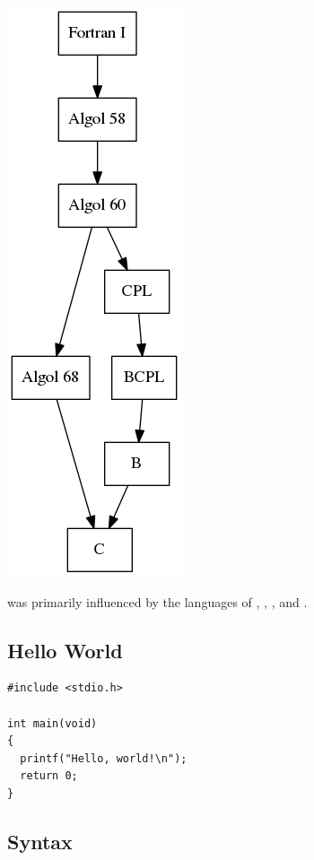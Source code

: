 \documentclass[../languages.tex]{subfiles}
\begin{document}
\begin{Figure}
  \centering
  \includegraphics[height=0.5\textheight]{c}
\end{Figure}

 was primarily influenced by the languages of ,
, , and .

\subsection{Hello World}
\label{sub:hello_world}

\begin{verbatim}
#include <stdio.h>

int main(void)
{
  printf("Hello, world!\n");
  return 0;
}
\end{verbatim}

\subsection{Syntax}
\label{sub:syntax}
\end{document}
